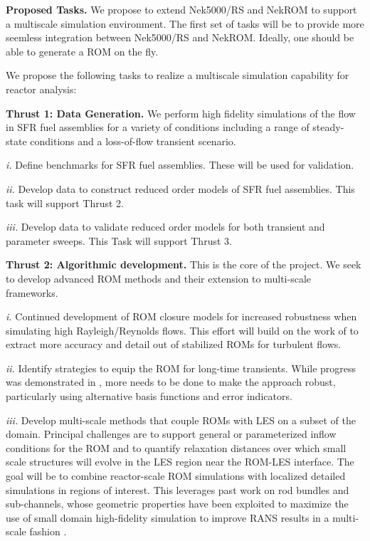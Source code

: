 \noindent
{\bf Proposed Tasks.}
We propose to extend Nek5000/RS and NekROM to support a multiscale simulation
environment.   The first set of tasks will be to provide more seemless integration
between Nek5000/RS and NekROM.  Ideally, one should be able to generate a ROM
on the fly.

We propose the following tasks to realize a multiscale simulation
capability for reactor analysis:

\textbf{Thrust 1: Data Generation.} We perform high fidelity simulations of the flow in SFR fuel assemblies for a variety of conditions including a range of steady-state conditions and a loss-of-flow transient scenario.
\begin{description}
\item{\em i.}
Define benchmarks for SFR fuel assemblies. These will be used for validation.
\item{\em ii.}
Develop data to construct reduced order models of SFR fuel assemblies. This task will support Thrust 2.
\item{\em iii.}
Develop data to validate reduced order models for both transient and parameter sweeps. This Task will support Thrust 3.
\end{description}

\textbf{Thrust 2: Algorithmic development.} This is the core of the project.
We seek to develop advanced ROM methods and their extension to multi-scale frameworks.
\begin{description}
\item{\em i.}
Continued development of ROM closure models for increased robustness when
simulating high Rayleigh/Reynolds flows.  This effort will build on the work of
\cite{kaneko22a,kaneko22,tsai22a} to extract more accuracy and detail out of
stabilized ROMs for turbulent flows.
\item{\em ii.}
Identify strategies to equip the ROM for long-time transients.  While progress
was demonstrated in \cite{kaneko20a}, more needs to be done to make the
approach robust, particularly using alternative basis functions and error
indicators.
\item{\em iii.}
Develop multi-scale methods that couple ROMs with LES on a subset of
the domain.  Principal challenges are to support general or
parameterized inflow conditions for the ROM and to quantify relaxation
distances over which small scale structures will evolve in the LES region
near the ROM-LES interface. The goal will be to combine reactor-scale ROM simulations with localized
detailed simulations in regions of interest. This leverages past work on rod bundles and sub-channels, whose geometric properties have been exploited to maximize the use of small domain high-fidelity simulation to improve RANS results in a multi-scale fashion \cite{martinez2019a}.
\end{description}%

